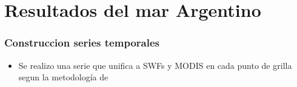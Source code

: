 \documentclass{beamer}
\begin{document}
\section{Resultados del mar Argentino}
\begin{frame}
\frametitle{Construccion series temporales}

\begin{itemize}
	\item Se realizo una serie que unifica a SWFs y MODIS en cada punto de grilla segun la metodología de \cite{marrari}
\end{itemize}

\end{frame}


%
%
% 
%        
%
\end{document}
